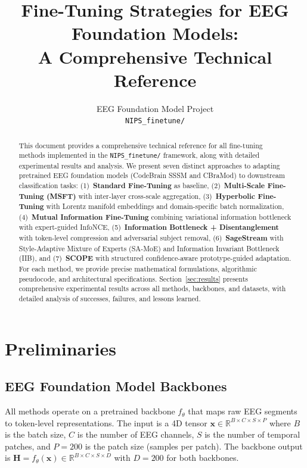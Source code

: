 \documentclass{article}
\title{Fine-Tuning Strategies for EEG Foundation Models:\\
A Comprehensive Technical Reference}
\author{
  EEG Foundation Model Project \\
  \texttt{NIPS\_finetune/}
}
\newcommand{\R}{\mathbb{R}}
\newcommand{\bx}{\bm{x}}
\begin{document}
\maketitle

\begin{abstract}
This document provides a comprehensive technical reference for all fine-tuning methods implemented in the \texttt{NIPS\_finetune/} framework, along with detailed experimental results and analysis.
We present seven distinct approaches to adapting pretrained EEG foundation models (CodeBrain SSSM and CBraMod) to downstream classification tasks:
(1)~\textbf{Standard Fine-Tuning} as baseline,
(2)~\textbf{Multi-Scale Fine-Tuning (MSFT)} with inter-layer cross-scale aggregation,
(3)~\textbf{Hyperbolic Fine-Tuning} with Lorentz manifold embeddings and domain-specific batch normalization,
(4)~\textbf{Mutual Information Fine-Tuning} combining variational information bottleneck with expert-guided InfoNCE,
(5)~\textbf{Information Bottleneck + Disentanglement} with token-level compression and adversarial subject removal,
(6)~\textbf{SageStream} with Style-Adaptive Mixture of Experts (SA-MoE) and Information Invariant Bottleneck (IIB),
and (7)~\textbf{SCOPE} with structured confidence-aware prototype-guided adaptation.
For each method, we provide precise mathematical formulations, algorithmic pseudocode, and architectural specifications.
Section~\ref{sec:results} presents comprehensive experimental results across all methods, backbones, and datasets, with detailed analysis of successes, failures, and lessons learned.
\end{abstract}

\section{Preliminaries}
\label{sec:prelim}

\subsection{EEG Foundation Model Backbones}

All methods operate on a pretrained backbone $f_\theta$ that maps raw EEG segments to token-level representations.
The input is a 4D tensor $\bx \in \R^{B \times C \times S \times P}$ where $B$ is the batch size, $C$ is the number of EEG channels, $S$ is the number of temporal patches, and $P = 200$ is the patch size (samples per patch).
The backbone output is $\bm{H} = f_\theta(\bx) \in \R^{B \times C \times S \times D}$ with $D = 200$ for both backbones.
\end{document}
